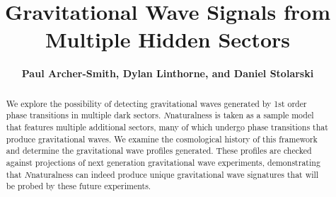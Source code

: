 \documentclass[nofootinbib,twocolumn,preprintnumbers]{revtex4-1}
\begin{document}
\def\lsim{\mathrel{\rlap{\lower4pt\hbox{\hskip1pt$\sim$}}
  \raise1pt\hbox{$<$}}}
\def\gsim{\mathrel{\rlap{\lower4pt\hbox{\hskip1pt$\sim$}}
  \raise1pt\hbox{$>$}}}
\newcommand{\vev}[1]{ \left\langle {#1} \right\rangle }
\newcommand{\bra}[1]{ \langle {#1} | }
\newcommand{\ket}[1]{ | {#1} \rangle }
\newcommand{\ev}{ {\rm eV} }
\newcommand{\kev}{{\rm keV}}
\newcommand{\mev}{{\rm MeV}}
\newcommand{\gev}{{\mathrm GeV}}
\newcommand{\tev}{{\rm TeV}}
\newcommand{\mpl}{$M_{Pl}$}
\newcommand{\mw}{$M_{W}$}
\newcommand{\Ft}{F_{T}}
\newcommand{\Zparity}{\mathbb{Z}_2}
\newcommand{\BLambda}{\boldsymbol{\lambda}}
\newcommand{\met}{\;\not\!\!\!{E}_T}
\newcommand{\beq}{\begin{equation}}
\newcommand{\eeq}{\end{equation}}
\newcommand{\bea}{\begin{eqnarray}}
\newcommand{\eea}{\end{eqnarray}}
\newcommand{\nn}{\nonumber}
\newcommand{\hc}{\mathrm{h.c.}}
\newcommand{\eps}{\epsilon}
\newcommand{\bwt}{\begin{widetext}}
\newcommand{\ewt}{\end{widetext}}
\newcommand{\draftnote}[1]{{\bf\color{blue} #1}}
\newcommand{\cO}{{\cal O}}
\newcommand{\cL}{{\cal L}}
\newcommand{\cM}{{\cal M}}
\newcommand{\fref}[1]{Fig.~\ref{fig:#1}} 
\newcommand{\eref}[1]{Eq.~\eqref{eq:#1}} 
\newcommand{\aref}[1]{Appendix~\ref{app:#1}}
\newcommand{\sref}[1]{Section~\ref{sec:#1}}
\newcommand{\tref}[1]{Table~\ref{tab:#1}}
\title{\LARGE{{\bf{Gravitational Wave Signals from Multiple Hidden Sectors} \\
}}}
\author{{\bf {Paul Archer-Smith, Dylan Linthorne, and Daniel Stolarski}}}
\begin{abstract}
We explore the possibility of detecting gravitational waves generated by 1st order phase transitions in multiple dark sectors. $N$naturalness is taken as a sample model that features multiple additional sectors, many of which undergo phase transitions that produce gravitational waves. We examine the cosmological history of this framework and determine the gravitational wave profiles generated. These profiles are checked against projections of next generation gravitational wave experiments, demonstrating that $N$naturalness can indeed produce unique gravitational wave signatures that will be probed by these future experiments. 
\end{abstract}
\maketitle
\end{document}
